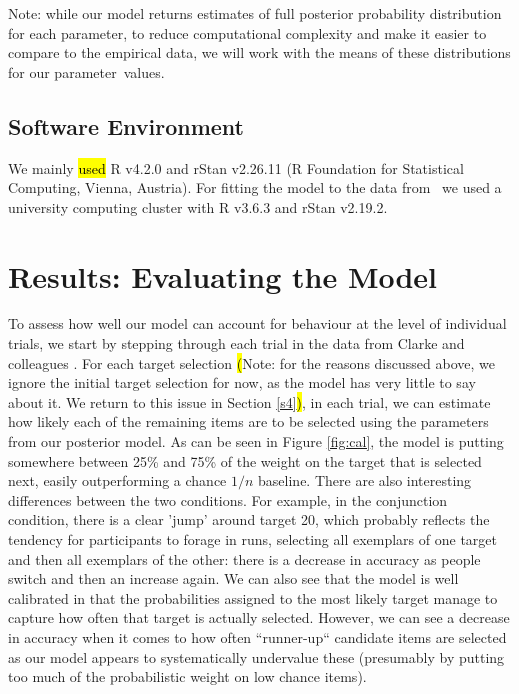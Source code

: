 \documentclass[vision,article,accept,pdftex,moreauthors]{Definitions/mdpi}
\begin{document}
Note: while our model returns estimates of full posterior probability distribution for each parameter, to reduce computational complexity and make it easier to compare to the empirical data, we will work with the means of these distributions for our parameter~values. 

\subsection{Software Environment}
 
We mainly \hl{used} R v4.2.0 and rStan v2.26.11 \cite{rstan} (R Foundation for Statistical Computing, Vienna, Austria). For fitting the model to the data from~\cite{clarke2022} we used a university computing cluster with R v3.6.3 and rStan v2.19.2.%

\section{Results: Evaluating the Model}

To assess how well our model can account for behaviour at the level of individual trials, we start by stepping through each trial in the data from Clarke and colleagues \cite{clarke2022}. For each target selection \hl{(}Note: for the reasons discussed above, we ignore the initial target selection for now, as the model has very little to say about it. We return to this issue in Section \ref{s4}\hl{)}, %
in each trial, we can estimate how likely each of the remaining items are to be selected using the parameters from our posterior model. As can be seen in Figure \ref{fig:cal}, the model is putting somewhere between 25\% and 75\% of the weight on the target that is selected next, easily outperforming a chance $1/n$ baseline. There are also interesting differences between the two conditions. For example, in the conjunction condition, there is a clear 'jump' around target 20, which probably reflects the tendency for participants to forage in runs, selecting all exemplars of one target and then all exemplars of the other: there is a decrease in accuracy as people switch and then an increase again. We can also see that the model is well calibrated in that the probabilities assigned to the most likely target manage to capture how often that target is actually selected. However, we can see a decrease in accuracy when it comes to how often ``runner-up`` candidate items are selected as our model appears to systematically undervalue these (presumably by putting too much of the probabilistic weight on low chance items).
\end{document}

